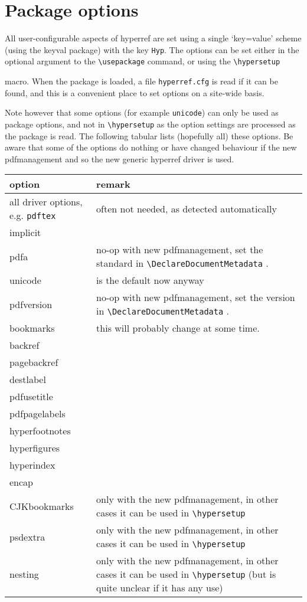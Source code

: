 \documentclass{article}
\newcommand*{\cs}[1]{%
  \texttt{\textbackslash #1}%
}
\newcommand*{\xpackage}[1]{\textsf{#1}}
\begin{document}
\section{Package options}

All user-configurable aspects of \xpackage{hyperref} are set using a
single `key=value' scheme (using the \xpackage{keyval} package) with the
key \texttt{Hyp}. The options can be set either in the optional argument
to the \cs{usepackage} command, or using the \cs{hypersetup}
macro. When the package is loaded, a file \texttt{hyperref.cfg} is read
if it can be found, and this is a convenient place to set options on a
site-wide basis.

Note however that some options (for example \texttt{unicode}) can only be used as
package options, and not in \verb|\hypersetup| as the option settings are processed
as the package is read. The following tabular lists (hopefully all) these options.
Be aware that some of the options do nothing or have
changed behaviour if the new pdfmanagement and so the new generic \xpackage{hyperref} driver is used.

\begin{tabular}{>{\ttfamily}l>{\raggedright\arraybackslash}p{5cm}}
option     & remark \\\hline
all driver options, e.g. \texttt{pdftex} & often not needed, as detected automatically\\
implicit   \\
pdfa       & no-op with new pdfmanagement, set the standard in \cs{DeclareDocumentMetadata}.\\
unicode    & is the default now anyway\\
pdfversion & no-op with new pdfmanagement, set the version in \cs{DeclareDocumentMetadata}.\\
bookmarks  & this will probably change at some time. \\
backref &\\
pagebackref & \\
destlabel  &\\
pdfusetitle &\\
pdfpagelabels &\\
hyperfootnotes &\\
hyperfigures&\\
hyperindex &\\
encap &\\
CJKbookmarks & only with the new pdfmanagement, in other cases it can be used in \cs{hypersetup}\\
psdextra     & only with the new pdfmanagement, in other cases it can be used in \cs{hypersetup}\\
nesting      & only with the new pdfmanagement, in other cases it can be used in \cs{hypersetup} (but
               is quite unclear if it has any use)\\

\end{tabular}
\end{document}
